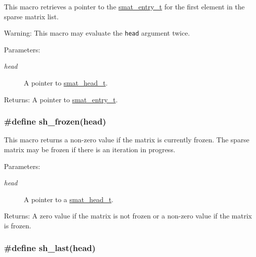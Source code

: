 This macro retrieves a pointer to the \hyperlink{group__dbprim__smat_a2}{smat\_\-entry\_\-t} for the first element in the sparse matrix list.

\begin{Desc}
\item[Warning:]This macro may evaluate the {\tt head} argument twice.\end{Desc}
\begin{Desc}
\item[Parameters:]
\begin{description}
\item[{\em head}]A pointer to \hyperlink{group__dbprim__smat_a1}{smat\_\-head\_\-t}.\end{description}
\end{Desc}
\begin{Desc}
\item[Returns:]A pointer to \hyperlink{group__dbprim__smat_a2}{smat\_\-entry\_\-t}. \end{Desc}
\hypertarget{group__dbprim__smat_a32}{
\subsubsection[sh\_\-frozen]{\setlength{\rightskip}{0pt plus 5cm}\#define sh\_\-frozen(head)}}
\label{group__dbprim__smat_a32}


This macro returns a non-zero value if the matrix is currently frozen. The sparse matrix may be frozen if there is an iteration in progress.

\begin{Desc}
\item[Parameters:]
\begin{description}
\item[{\em head}]A pointer to a \hyperlink{group__dbprim__smat_a1}{smat\_\-head\_\-t}.\end{description}
\end{Desc}
\begin{Desc}
\item[Returns:]A zero value if the matrix is not frozen or a non-zero value if the matrix is frozen. \end{Desc}
\hypertarget{group__dbprim__smat_a35}{
\subsubsection[sh\_\-last]{\setlength{\rightskip}{0pt plus 5cm}\#define sh\_\-last(head)}}
\label{group__dbprim__smat_a35}


